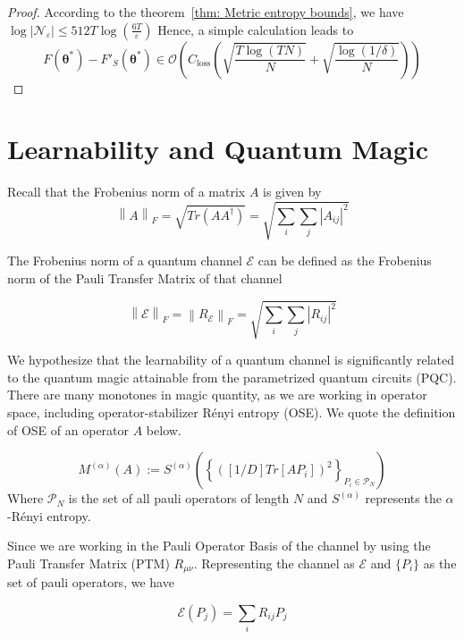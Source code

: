 \documentclass[%
 reprint,
superscriptaddress,
 amsmath,amssymb,
 aps,
]{revtex4-2}
\newcommand{\E}{\mathcal{E}}
\newcommand{\norm}[1]{\left\lVert#1\right\rVert}
\begin{document}
\begin{proof}
    According to the theorem~\ref{thm: Metric entropy bounds}, we have $\log{|\mathcal{N}_\varepsilon|}\le 512 T\log{\left(
    \frac{6T}{\varepsilon}\right)
    }$
    Hence, a simple calculation leads to
\begin{equation}
        F\left(\boldsymbol{\theta}^*\right)-F'_S\left(\boldsymbol{\theta}^*\right) \in \mathcal{O}\left(C_{\operatorname{loss}}\left(\sqrt{\frac{T \log (T N)}{N}}+\sqrt{\frac{\log (1 / \delta)}{N}}\right)\right)
    \end{equation}
\end{proof}

\section{Learnability and Quantum Magic}

Recall that the Frobenius norm of a matrix $A$ is given by 
\begin{equation}
\norm{A}_F=\sqrt{Tr(AA^\dagger)}=\sqrt{\sum_i\sum_j|A_{ij}|^2}
\end{equation}

The Frobenius norm of a quantum channel $\E$ can be defined as the Frobenius norm of the Pauli Transfer Matrix of that channel

\begin{equation}
    \norm{\E}_F=\norm{R_{\E}}_F=\sqrt{\sum_i\sum_j|R_{ij}|^2}
\end{equation}

We hypothesize that the learnability of a quantum channel is significantly related to the quantum magic attainable from the parametrized quantum circuits (PQC). There are many monotones in magic quantity, as we are working in operator space, including operator-stabilizer Rényi entropy (OSE). We quote the definition of OSE of an operator $A$ below.

\begin{equation}
    M^{(\alpha)}(A) := S^{(\alpha)}\left(\left\{ ([1/D]Tr[AP_i])^2\right\}_{P_i\in\mathcal{P}_N}\right)
\end{equation}
Where $\mathcal{P}_N$ is the set of all pauli operators of length $N$ and $S^{(\alpha)}$ represents the $\alpha$-Rényi entropy.

Since we are working in the Pauli Operator Basis of the channel by using the Pauli Transfer Matrix (PTM) $R_{\mu\nu}$. Representing the channel as $\E$ and $\{P_i\}$ as the set of pauli operators, we have

\begin{equation}
    \E(P_j) = \sum_iR_{ij}P_j
\end{equation}
\end{document}
